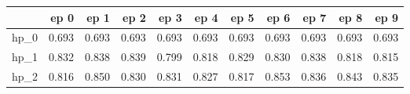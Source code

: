 \begin{tabular}{lrrrrrrrrrr}
\toprule
{} &   ep 0 &   ep 1 &   ep 2 &   ep 3 &   ep 4 &   ep 5 &   ep 6 &   ep 7 &   ep 8 &   ep 9 \\
\midrule
hp\_0 &  0.693 &  0.693 &  0.693 &  0.693 &  0.693 &  0.693 &  0.693 &  0.693 &  0.693 &  0.693 \\
hp\_1 &  0.832 &  0.838 &  0.839 &  0.799 &  0.818 &  0.829 &  0.830 &  0.838 &  0.818 &  0.815 \\
hp\_2 &  0.816 &  0.850 &  0.830 &  0.831 &  0.827 &  0.817 &  0.853 &  0.836 &  0.843 &  0.835 \\
\bottomrule
\end{tabular}
